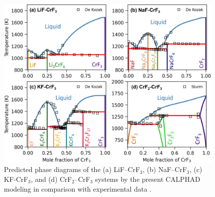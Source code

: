 \begin{figure}[H]
    \centering
    \includegraphics[width=1\linewidth]{moltensalts/Moltensalts-FLiNaKCr-Phasediagram.jpg}
    \caption{Predicted phase diagrams of the (a) LiF–CrF$_3$, (b) NaF–CrF$_3$, (c) KF-CrF$_3$, and (d) CrF$_2$–CrF$_3$ systems by the present CALPHAD modeling in comparison with experimental data \cite{de1975systeme, DeKozak1969, sturm1962phase}.}
    \label{ms:fig:FLiNaKCr-Phasediagram}
\end{figure}
\begingroup
\renewcommand\arraystretch{0.8}
